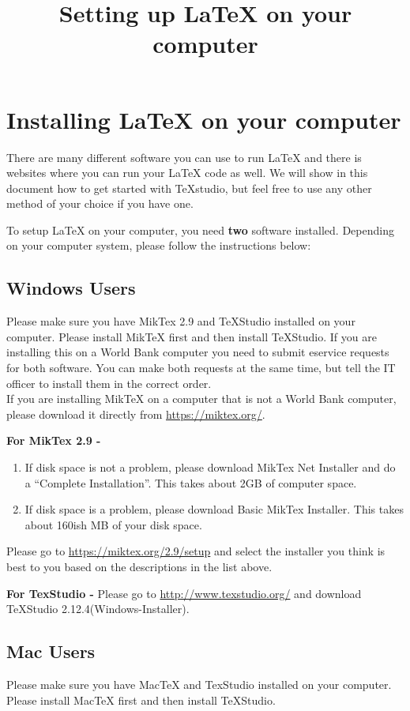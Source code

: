 \documentclass[]{article}
\title{Setting up {\LaTeX} on your computer}
\begin{document}
\maketitle
\section*{Installing {\LaTeX} on your computer}
There are many different software you can use to run {\LaTeX} and there is websites where you can run your {\LaTeX} code as well. We will show in this document how to get started with TeXstudio, but feel free to use any other method of your choice if you have one.

To setup {\LaTeX} on your computer, you need \textbf{two} software installed. Depending on your computer system, please follow the instructions below:

\subsection*{Windows Users}
Please make sure you have MikTex 2.9 and TeXStudio installed on your computer. Please install MikTeX first and then install TeXStudio. If you are installing this on a World Bank computer you need to submit eservice requests for both software. You can make both requests at the same time, but tell the IT officer to install them in the correct order. \\

If you are installing MikTeX on a computer that is not a World Bank computer, please download it directly from \url{https://miktex.org/}.

\textbf{For MikTex 2.9 -}
\begin{enumerate}
\item If disk space is not a problem, please download MikTex Net Installer and do a ``Complete Installation''. This takes about 2GB of computer space.

\item If disk space is a problem, please download Basic MikTex Installer. This takes about 160ish MB of your disk space.
\end{enumerate}

Please go to \url{https://miktex.org/2.9/setup} and select the installer you think is best to you based on the descriptions in the list above.

\textbf{For TexStudio -  }
Please go to \url{http://www.texstudio.org/} and download TeXStudio 2.12.4(Windows-Installer).

\subsection*{Mac Users}
Please make sure you have MacTeX and TexStudio installed on your computer. Please install MacTeX first and then install TeXStudio.  \\
\end{document}
